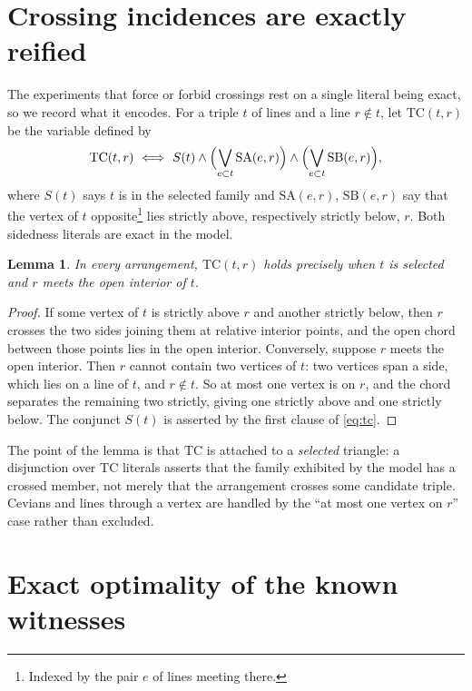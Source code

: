 \documentclass[11pt]{article}
\newtheorem{lemma}[theorem]{Lemma}
\theoremstyle{definition}
\begin{document}
\section{Crossing incidences are exactly reified}\label{sec:tc}

The experiments that force or forbid crossings rest on a single literal being
exact, so we record what it encodes. For a triple $t$ of lines and a line
$r\notin t$, let $\mathrm{TC}(t,r)$ be the variable defined by
\begin{equation}\label{eq:tc}
 \mathrm{TC}(t,r)\ \Longleftrightarrow\ S(t)\wedge
 \Bigl(\bigvee_{e\subset t}\mathrm{SA}(e,r)\Bigr)\wedge
 \Bigl(\bigvee_{e\subset t}\mathrm{SB}(e,r)\Bigr),
\end{equation}
where $S(t)$ says $t$ is in the selected family and $\mathrm{SA}(e,r)$,
$\mathrm{SB}(e,r)$ say that the vertex of $t$ opposite\footnote{Indexed by
the pair $e$ of lines meeting there.} lies strictly above, respectively
strictly below, $r$. Both sidedness literals are exact in the model.

\begin{lemma}\label{lem:tc}
In every arrangement, $\mathrm{TC}(t,r)$ holds precisely when $t$ is selected
and $r$ meets the open interior of $t$.
\end{lemma}

\begin{proof}
If some vertex of $t$ is strictly above $r$ and another strictly below, then
$r$ crosses the two sides joining them at relative interior points, and the
open chord between those points lies in the open interior. Conversely,
suppose $r$ meets the open interior. Then $r$ cannot contain two vertices of
$t$: two vertices span a side, which lies on a line of $t$, and $r\notin t$.
So at most one vertex is on $r$, and the chord separates the remaining two
strictly, giving one strictly above and one strictly below. The conjunct
$S(t)$ is asserted by the first clause of \eqref{eq:tc}.
\end{proof}

The point of the lemma is that $\mathrm{TC}$ is attached to a \emph{selected}
triangle: a disjunction over $\mathrm{TC}$ literals asserts that the family
exhibited by the model has a crossed member, not merely that the arrangement
crosses some candidate triple. Cevians and lines through a vertex are handled
by the ``at most one vertex on $r$'' case rather than excluded.

\section{Exact optimality of the known witnesses}
\end{document}
